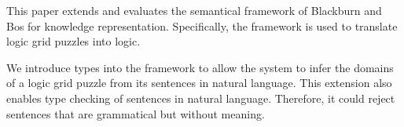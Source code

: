 This paper extends and evaluates the semantical framework of Blackburn and Bos for knowledge representation. Specifically, the framework is used to translate logic grid puzzles into logic.


We introduce types into the framework to allow the system to infer the domains of a logic grid puzzle from its sentences in natural language. This extension also enables type checking of sentences in natural language. Therefore, it could reject sentences that are grammatical but without meaning.

